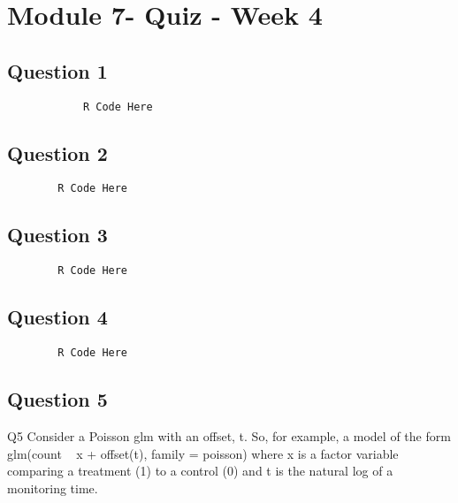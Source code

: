 \documentclass[french]{article}
\begin{document}
	
	\section*{Module 7- Quiz - Week 4}
	\subsection*{Question 1}
		\begin{framed}
			\begin{verbatim}
			R Code Here
			\end{verbatim}
		\end{framed}
	\newpage
	\subsection*{Question 2}
	
	\begin{framed}
		\begin{verbatim}
		R Code Here
		\end{verbatim}
	\end{framed}
	\newpage
	\subsection*{Question 3}
	
	\begin{framed}
		\begin{verbatim}
		R Code Here
		\end{verbatim}
	\end{framed}
	\newpage
	\subsection*{Question 4}
	\begin{framed}
		\begin{verbatim}
		R Code Here
		\end{verbatim}
	\end{framed}
	\newpage
	\subsection*{Question 5}
Q5
Consider a Poisson glm with an offset, t. So, for example, a model of the form glm(count ~ x + offset(t), family = poisson) where x is a factor variable comparing a treatment (1) to a control (0) and t is the natural log of a monitoring time.
\end{document}
